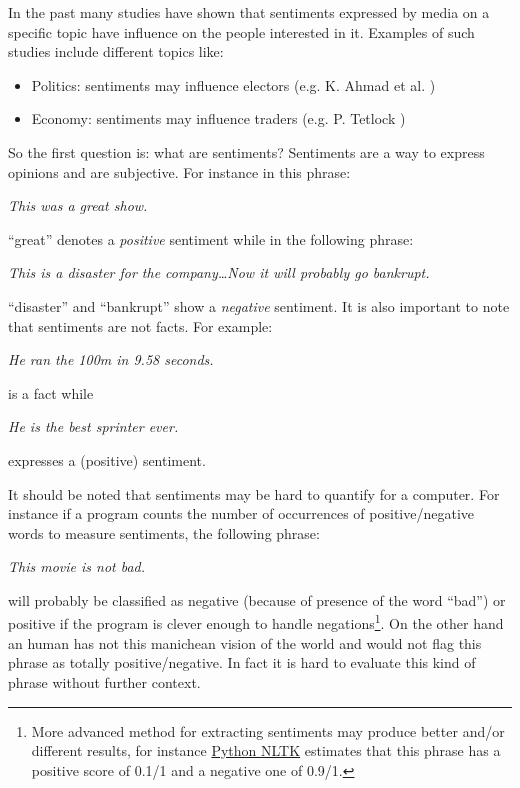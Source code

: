\documentclass[12pt]{report}
\begin{document}
In the past many studies have shown that sentiments expressed by media on a specific topic have influence on the people interested in it. Examples of such studies include different topics like:

\begin{itemize}
	\item Politics: sentiments may influence electors (e.g. K. Ahmad et al. \cite{ahmad11})
	\item Economy: sentiments may influence traders (e.g. P. Tetlock \cite{tetlock07})
\end{itemize}

So the first question is: what are sentiments? Sentiments are a way to express opinions and are subjective. For instance in this phrase:

\begin{center}
	\emph{This was a {\color{green}great} show.}
\end{center}

``{\color{green}great}'' denotes a \emph{positive} sentiment while in the following phrase:

\begin{center}
	\emph{This is a {\color{red}disaster} for the company\ldots Now it will probably go {\color{red}bankrupt}.}
\end{center}

``{\color{red}disaster}'' and ``{\color{red}bankrupt}'' show a \emph{negative} sentiment. It is also important to note that sentiments are not facts\cite{wright09}. For example:

\begin{center}
	\emph{He ran the 100m in 9.58 seconds.}
\end{center} is a fact while

\begin{center}
	\emph{He is the best sprinter ever.}
\end{center}

expresses a (positive) sentiment.

It should be noted that sentiments may be hard to quantify for a computer. For instance if a program counts the number of occurrences of positive/negative words to measure sentiments, the following phrase:

\begin{center}
	\emph{This movie is not bad.}
\end{center}

will probably be classified as negative (because of presence of the word ``bad'') or positive if the program is clever enough to handle negations\footnote{More advanced method for extracting sentiments may produce better and/or different results, for instance \href{http://text-processing.com/demo/sentiment/}{Python NLTK} estimates that this phrase has a positive score of 0.1/1 and a negative one of 0.9/1.}. On the other hand an human has not this manichean vision of the world and would not flag this phrase as totally positive/negative. In fact it is hard to evaluate this kind of phrase without further context.
\end{document}
